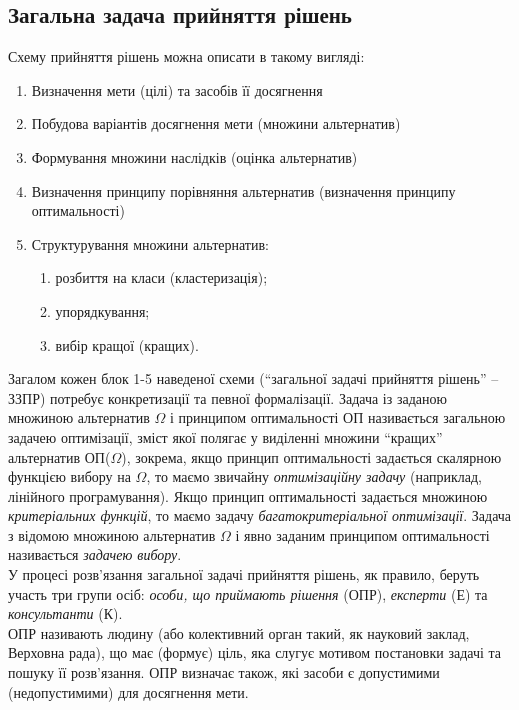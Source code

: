 \subsection{Загальна задача прийняття рішень}

Схему прийняття рішень можна описати в такому вигляді:
\begin{enumerate}
	\item Визначення мети (цілі) та засобів її досягнення
	\item Побудова варіантів досягнення мети (множини альтернатив)
	\item Формування множини наслідків (оцінка альтернатив)
	\item Визначення принципу порівняння альтернатив (визначення принципу оптимальності)
	\item Структурування множини альтернатив:
	\begin{enumerate}
		\item розбиття на класи (кластеризація);
		\item упорядкування;
		\item вибір кращої (кращих).
	\end{enumerate}
\end{enumerate}

Загалом кожен блок 1-5 наведеної схеми (``загальної задачі прийняття рішень'' -- ЗЗПР) потребує конкретизації та певної формалізації. Задача із заданою множиною альтернатив $\Omega$ і принципом оптимальності ОП називається загальною задачею оптимізації, зміст якої полягає у виділенні множини ``кращих'' альтернатив ОП($\Omega$), зокрема, якщо принцип оптимальності задається скалярною функцією вибору на $\Omega$, то маємо звичайну \textit{оптимізаційну задачу} (наприклад, лінійного програмування). Якщо принцип оптимальності задається множиною \textit{критеріальних функцій}, то маємо задачу \textit{багатокритеріальної оптимізації}. Задача з відомою множиною альтернатив $\Omega$ і явно заданим принципом оптимальності називається \textit{задачею вибору}. \\

У процесі розв'язання загальної задачі прийняття рішень, як правило, беруть участь три групи осіб: \textit{особи, що приймають рішення} (ОПР), \textit{експерти} (Е) та \textit{консультанти} (К). \\

ОПР називають людину (або колективний орган такий, як науковий заклад, Верховна рада), що має (формує) ціль, яка слугує мотивом постановки задачі та пошуку її розв'язання. ОПР визначає також, які засоби є допустимими (недопустимими) для досягнення мети. \\

